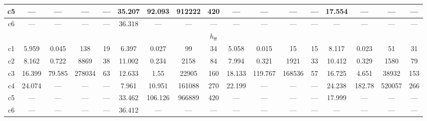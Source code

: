 \begin{tabular}{|c|c|c|c|c|c|c|c|c|c|c|c|c|c|c|c|c|}
\hline%
c5&\small{---}&\small{---}&\small{---}&\small{---}&\small{35.207}&\small{92.093}&\small{912222}&\small{420}&\small{---}&\small{---}&\small{---}&\small{---}&\small{17.554}&\small{---}&\small{---}&\small{---}\\%
\hline%
c6&\small{---}&\small{---}&\small{---}&\small{---}&\small{36.318}&\small{---}&\small{---}&\small{---}&\small{---}&\small{---}&\small{---}&\small{---}&\small{---}&\small{---}&\small{---}&\small{---}\\%
\hline%
\multicolumn{17}{|c|}{$h_{\mathsf{ff}}$}\\%
\hline%
c1&\small{5.959}&\small{0.045}&\small{138}&\small{19}&\small{6.397}&\small{0.027}&\small{99}&\small{34}&\small{5.058}&\small{0.015}&\small{15}&\small{15}&\small{8.117}&\small{0.023}&\small{51}&\small{31}\\%
\hline%
c2&\small{8.162}&\small{0.722}&\small{8869}&\small{38}&\small{11.002}&\small{0.234}&\small{2158}&\small{84}&\small{7.994}&\small{0.321}&\small{1921}&\small{33}&\small{10.412}&\small{0.329}&\small{1580}&\small{79}\\%
\hline%
c3&\small{16.399}&\small{79.585}&\small{278034}&\small{63}&\small{12.633}&\small{1.55}&\small{22905}&\small{160}&\small{18.133}&\small{119.767}&\small{168536}&\small{57}&\small{16.725}&\small{4.651}&\small{38932}&\small{153}\\%
\hline%
c4&\small{24.074}&\small{---}&\small{---}&\small{---}&\small{7.961}&\small{10.951}&\small{161088}&\small{270}&\small{22.199}&\small{---}&\small{---}&\small{---}&\small{24.238}&\small{182.78}&\small{520057}&\small{266}\\%
\hline%
c5&\small{---}&\small{---}&\small{---}&\small{---}&\small{33.462}&\small{106.126}&\small{966889}&\small{420}&\small{---}&\small{---}&\small{---}&\small{---}&\small{17.999}&\small{---}&\small{---}&\small{---}\\%
\hline%
c6&\small{---}&\small{---}&\small{---}&\small{---}&\small{36.412}&\small{---}&\small{---}&\small{---}&\small{---}&\small{---}&\small{---}&\small{---}&\small{---}&\small{---}&\small{---}&\small{---}\\%
\hline%
\end{tabular}